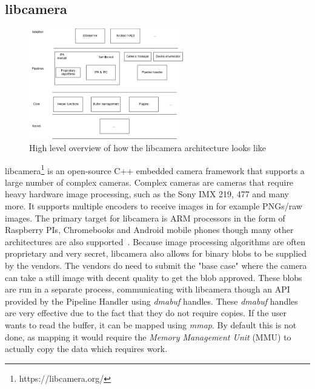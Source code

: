 \subsection{libcamera}
\begin{figure}
    \begin{center}
        \includegraphics[width=0.60\textwidth]{figures/libcameraarch.png}
    \end{center}
    \caption{High level overview of how the libcamera architecture looks like}
    \label{fig:libcameraarch}
\end{figure}

libcamera\footnote{https://libcamera.org/} is an open-source C++ embedded
camera framework that supports a large number of complex cameras. Complex
cameras are cameras that require heavy hardware image processing, such as the
Sony IMX 219, 477 and many more. It supports multiple encoders to receive
images in for example PNGs/raw images. The primary target for libcamera is ARM
processors in the form of Raspberry PIs, Chromebooks and Android mobile phones
though many other architectures are also supported~\cite{libcameraStack}.
Because image processing algorithms are often proprietary and very secret,
libcamera also allows for binary blobs to be supplied by the vendors. The
vendors do need to submit the "base case" where the camera can take a still
image with decent quality to get the blob approved. These blobs are run in a
separate process, communicating with libcamera though an API provided by the
Pipeline Handler using \textit{dmabuf} handles. These \textit{dmabuf} handles
are very effective due to the fact that they do not require copies. If the user
wants to read the buffer, it can be mapped using \textit{mmap}. By default this
is not done, as mapping it would require the \textit{Memory Management Unit}
(MMU) to actually copy the data which requires work.

